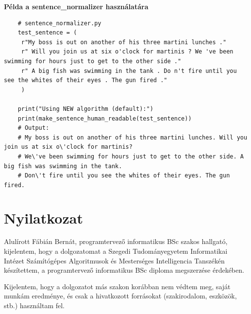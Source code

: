 \documentclass[12pt]{report}
\theoremstyle{definition}
\begin{document}
\clearpage

\label{fig:sentence-normalizer}
{\Large\bf Példa a sentence\_normalizer használatára}
\begin{lstlisting}
    # sentence_normalizer.py
    test_sentence = (
     r"My boss is out on another of his three martini lunches ."
     r" Will you join us at six o'clock for martinis ? We 've been swimming for hours just to get to the other side ."
     r" A big fish was swimming in the tank . Do n't fire until you see the whites of their eyes . The gun fired ."
     )

    print("Using NEW algorithm (default):")
    print(make_sentence_human_readable(test_sentence))
    # Output:
    # My boss is out on another of his three martini lunches. Will you join us at six o\'clock for martinis?
    # We\'ve been swimming for hours just to get to the other side. A big fish was swimming in the tank.
    # Don\'t fire until you see the whites of their eyes. The gun fired.
\end{lstlisting}


\medskip

\printbibliography

\chapter*{Nyilatkozat}




\noindent
Alulírott Fábián Bernát, programtervező informatikus BSc szakos hallgató, kijelentem, hogy a dolgozatomat a Szegedi Tudományegyetem Informatikai Intézet Számítógépes Algoritmusok és Mesterséges Intelligencia Tanszékén készítettem, a programtervező informatikus BSc diploma megszerzése érdekében.

Kijelentem, hogy a dolgozatot más szakon korábban nem védtem meg, saját munkám eredménye, és csak a hivatkozott forrásokat (szakirodalom, eszközök, stb.) használtam fel.
\end{document}
